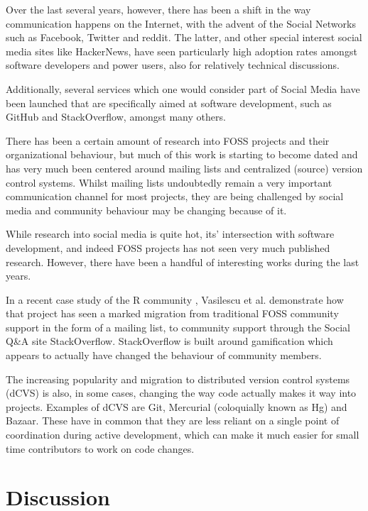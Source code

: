 \documentclass[a4paper,11pt]{article} %
\begin{document}
Over the last several years, however, there has been a shift in the
way communication happens on the Internet, with the advent of the
Social Networks such as Facebook, Twitter and reddit. The latter, and
other special interest social media sites like HackerNews, have seen
particularly high adoption rates amongst software developers and power
users, also for relatively technical discussions.

Additionally, several services which one would consider part of Social
Media have been launched that are specifically aimed at software
development, such as GitHub and StackOverflow, amongst many others.

There has been a certain amount of research into FOSS projects and
their organizational behaviour, but much of this work is starting to
become dated and has very much been centered around mailing lists and
centralized (source) version control systems. Whilst mailing
lists undoubtedly remain a very important communication channel for
most projects, they are being challenged by social media and community
behaviour may be changing because of it.

While research into social media is quite hot, its' intersection with
software development, and indeed FOSS projects has not seen very much
published research. However, there have been a handful of interesting
works during the last years.

In a recent case study of the R community
\cite{Vasilescu14StackOverflow}, Vasilescu et al. demonstrate how that
project has seen a marked migration from traditional FOSS community
support in the form of a mailing list, to community support through
the Social Q\&{}A site StackOverflow. StackOverflow is built around
gamification which appears to actually have changed the
behaviour of community members.



The increasing popularity and migration to distributed version control
systems (dCVS) is also, in some cases, changing the way code actually
makes it way into projects. Examples of dCVS are Git, Mercurial
(coloquially known as Hg) and Bazaar. These have in common that they
are less reliant on a single point of coordination during active
development, which can make it much easier for small time contributors
to work on code changes.



\section{Discussion}
\end{document}
